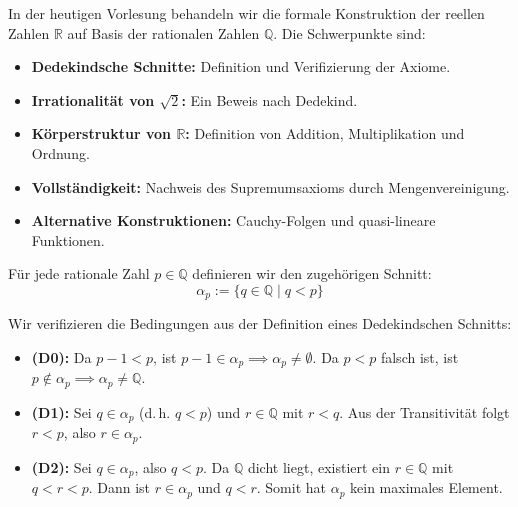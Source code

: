 
\begin{nice-box}
In der heutigen Vorlesung behandeln wir die formale Konstruktion der reellen Zahlen $\mathbb{R}$ auf Basis der rationalen Zahlen $\mathbb{Q}$. Die Schwerpunkte sind:
\begin{itemize}
    \item \textbf{Dedekindsche Schnitte:} Definition und Verifizierung der Axiome.
    \item \textbf{Irrationalität von $\sqrt{2}$:} Ein Beweis nach Dedekind.
    \item \textbf{Körperstruktur von $\mathbb{R}$:} Definition von Addition, Multiplikation und Ordnung.
    \item \textbf{Vollständigkeit:} Nachweis des Supremumsaxioms durch Mengenvereinigung.
    \item \textbf{Alternative Konstruktionen:} Cauchy-Folgen und quasi-lineare Funktionen.
\end{itemize}
\end{nice-box}

\begin{math-stroke}
Für jede rationale Zahl $p \in \mathbb{Q}$ definieren wir den zugehörigen Schnitt:
\begin{equation}
\label{eq:rational-cut}
\alpha_p := \{ q \in \mathbb{Q} \mid q < p \}
\end{equation}


\begin{short-proof}
Wir verifizieren die Bedingungen aus der Definition eines Dedekindschen Schnitts:
\begin{itemize}
    \item \textbf{(D0):} Da $p-1 < p$, ist $p-1 \in \alpha_p \implies \alpha_p \neq \emptyset$. Da $p < p$ falsch ist, ist $p \notin \alpha_p \implies \alpha_p \neq \mathbb{Q}$.
    \item \textbf{(D1):} Sei $q \in \alpha_p$ (d.\,h. $q < p$) und $r \in \mathbb{Q}$ mit $r < q$. Aus der Transitivität folgt $r < p$, also $r \in \alpha_p$.
    \item \textbf{(D2):} Sei $q \in \alpha_p$, also $q < p$. Da $\mathbb{Q}$ dicht liegt, existiert ein $r \in \mathbb{Q}$ mit $q < r < p$. Dann ist $r \in \alpha_p$ und $q < r$. Somit hat $\alpha_p$ kein maximales Element.
\end{itemize}
\end{short-proof}
\end{math-stroke}


